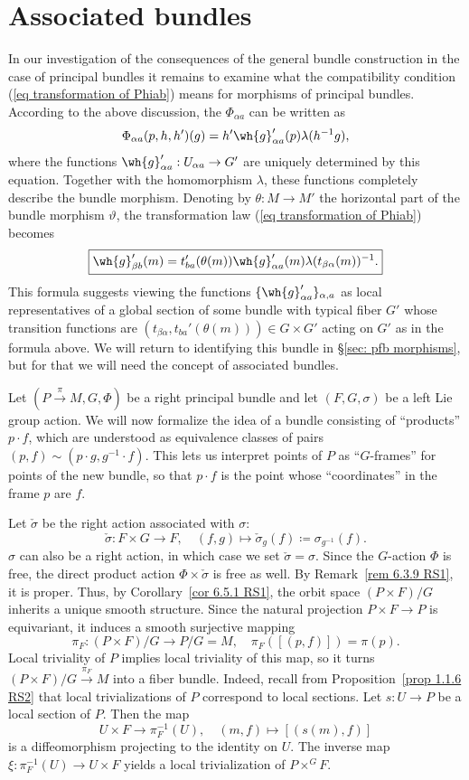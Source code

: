\section{Associated bundles}\label{sec: assoc bundles}


In our investigation of the consequences of the general bundle construction in the case of principal bundles it remains to examine what the compatibility condition (\ref{eq transformation of Phiab}) means for morphisms of principal bundles. According to the above discussion, the $\Phi_{\alpha a}$ can be written as
\[\Phi_{\alpha a}(p,h,h')(g)=h'\wh{g}'_{\alpha a}(p)\lambda(h^{-1}g),\]
where the functions $\wh{g}'_{\alpha a}:U_{\alpha a}\to G'$ are uniquely determined by this equation.  Together with the homomorphism $\lambda$, these functions completely describe the bundle morphism. Denoting by $\theta:M\to M'$ the horizontal part of the bundle morphism $\vartheta$, the transformation law (\ref{eq transformation of Phiab}) becomes
\[\boxed{\wh{g}'_{\beta b}(m)=t_{ba}'(\theta(m))\wh{g}_{\alpha a}'(m)\lambda(t_{\beta\alpha}(m))^{-1}.}\label{eq trans rule for ghat}\]
This formula suggests viewing the functions $\{\wh{g}'_{\alpha a}\}_{\alpha,a}$ as local representatives of a global section of some bundle with typical fiber $G'$ whose transition functions are $(t_{\beta\alpha},t_{ba}'(\theta(m)))\in G\times G'$ acting on $G'$ as in the formula above. We will return to identifying this bundle in \S\ref{sec: pfb morphisms}, but for that we will need the concept of associated bundles.

Let $(P\overset{\pi}{\to}M,G,\Phi)$ be a right principal bundle and let $(F,G,\sigma)$ be a left Lie group action. We will now formalize the idea of a bundle consisting of ``products'' $p\cdot f$, which are understood as equivalence classes of pairs $(p,f)\sim (p\cdot g,g^{-1}\cdot f)$. This lets us interpret points of $P$ as ``$G$-frames'' for points of the new bundle, so that $p\cdot f$ is the point whose ``coordinates'' in the frame $p$ are $f$. 

Let $\check\sigma$ be the right action associated with $\sigma$:
\[\check\sigma:F\times G\to F,\quad (f,g)\mapsto \check{\sigma}_g(f)\coloneqq \sigma_{g^{-1}}(f).\]
$\sigma$ can also be a right action, in which case we set $\check\sigma=\sigma$. Since the $G$-action $\Phi$ is free, the direct product action $\Phi\times \check\sigma$ is free as well. By Remark~\ref{rem 6.3.9 RS1}, it is proper. Thus, by Corollary~\ref{cor 6.5.1 RS1}, the orbit space $(P\times F)\slash G$ inherits a unique smooth structure. Since the natural projection $P\times F\to P$ is equivariant, it induces a smooth surjective mapping
\[\pi_F:(P\times F)\slash G\to P\slash G=M,\quad \pi_F([(p,f)])=\pi(p).\]
Local triviality of $P$ implies local triviality of this map, so it turns $(P\times F)\slash G \overset{\pi_F}{\to } M$ into a fiber bundle. Indeed, recall from Proposition~\ref{prop 1.1.6 RS2} that local trivializations of $P$ correspond to local sections. Let $s:U\to P$ be a local section of $P$. Then the map
\[U\times F\to \pi_F^{-1}(U),\quad (m,f)\mapsto [(s(m),f)]\]
is a diffeomorphism projecting to the identity on $U$. The inverse map $\xi:\pi_F^{-1}(U)\to U\times F$ yields a local trivialization of $P\times^G F$.

